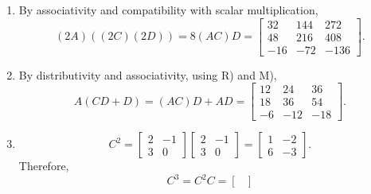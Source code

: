 \begin{enumerate}[label=\Alph*)]
\begin{answer}
$$\begin{bmatrix}
                        -2 & -9 & -17
                    \end{bmatrix} = \begin{bmatrix}
                        24 & 108 & 204 \\
                        36 & 162 & 306 \\
                        -12 & -54 & -102
                    \end{bmatrix}$$ 
            \end{answer}
            \item \begin{answer} %
                By associativity and compatibility with scalar multiplication,
                $$(2A)((2C)(2D)) = 8(AC)D = \begin{bmatrix}
                    32 & 144 & 272 \\
                    48 & 216 & 408 \\
                    -16 & -72 & -136
                \end{bmatrix}.$$
            \end{answer}
            \item \begin{answer} %
                By distributivity and associativity, using R) and M),
                $$A(CD+D) = (AC)D+AD = \begin{bmatrix}
                    12 & 24 & 36 \\
                    18 & 36 & 54 \\
                    -6 & -12 & -18
                \end{bmatrix}.$$
            \end{answer}
            \item \begin{answer} %
                $$C^2 = \begin{bmatrix}
                    2 & -1 \\
                    3 & 0
                \end{bmatrix}\begin{bmatrix}
                    2 & -1 \\
                    3 & 0
                \end{bmatrix} = \begin{bmatrix}
                    1 & -2 \\
                    6 & -3
                \end{bmatrix}.$$
                Therefore,
                $$C^3 = C^2C = \begin{bmatrix}

\end{bmatrix}$$
\end{answer}
\end{enumerate}
